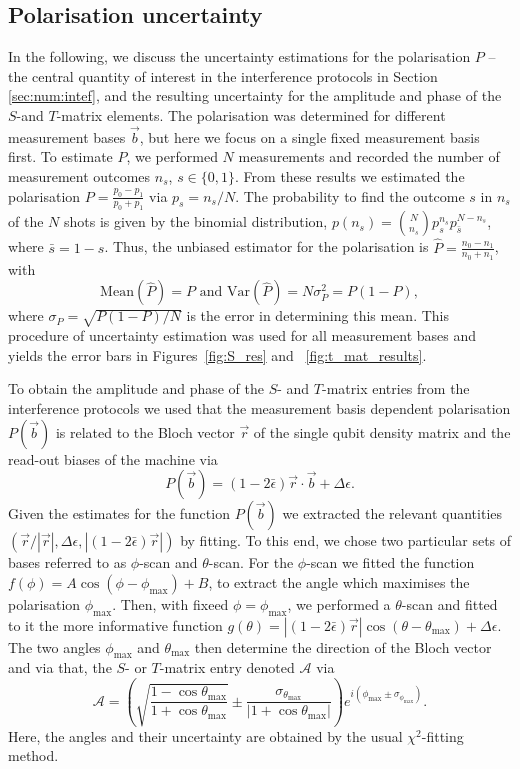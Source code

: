 \documentclass[a4paper,twocolumn,11pt, accepted=2024-06-14]{quantumarticle}
\begin{document}
\subsection{Polarisation uncertainty} \label{app:DATA_Anl}In the following, we discuss the uncertainty estimations for the polarisation $P$ -- the central quantity of interest in the interference protocols in Section \ref{sec:num:intef}, and the resulting uncertainty for the amplitude and phase of the $S$-and $T$-matrix elements. The polarisation was determined for different measurement bases $\vec b$, but here we focus on a single fixed measurement basis first. To estimate $P$, we performed $N$ measurements and recorded the number of measurement outcomes $n_s$, $s\in \{0,1\}$. From these results we estimated the polarisation $P = \frac{p_0 - p_1}{p_0 + p_1}$ via $p_s=n_s/N$. The probability to find the outcome $s$ in $n_s$ of the $N$ shots is given by the binomial distribution, $p(n_s) = {N \choose n_s} p_s^{n_s} p_{\bar{s}}^{N-n_s}$, where $\bar{s} = 1-s$. Thus,
the unbiased estimator for the polarisation is $\hat P = \frac{n_0 - n_1}{n_0 + n_1}$, with $$\text{Mean}(\hat P) =P\text{ and }\text{Var}(\hat{P}) = N\sigma_{P}^2 = P(1-P),$$ where $\sigma_{P}=\sqrt{P(1-P)/N}$ is the error in determining this mean. This procedure of uncertainty estimation was used for all measurement bases and yields the error bars in Figures~\ref{fig:S_res} and ~\ref{fig:t_mat_results}.

To obtain the amplitude and phase of the $S$- and $T$-matrix entries from the interference protocols we used that the measurement basis dependent polarisation $P(\vec b)$ is related to the Bloch vector $\vec r$ of the single qubit density matrix and the read-out biases of the machine via
$$P(\vec{b}) = (1-2\bar\epsilon)\vec{r}\cdot\vec{b} + \Delta\epsilon.$$ 
Given the estimates for the function $P(\vec{b})$ we extracted the relevant quantities $(\vec{r}/|\vec{r}|, \Delta\epsilon, |(1-2\bar\epsilon)\vec{r}|)$ by fitting. To this end, we chose two particular sets of bases referred to as $\phi$-scan and $\theta$-scan. For the $\phi$-scan we fitted the function $f(\phi) = A\cos(\phi - \phi_{\text{max}})+B$, to extract the angle which maximises the polarisation $\phi_{\text{max}}$. Then, with fixeed $\phi = \phi_{\text{max}}$, we performed a $\theta$-scan and fitted to it the more informative function $g(\theta) = |(1-2\bar\epsilon)\vec{r}|\cos(\theta - \theta_{\text{max}}) + \Delta\epsilon$. The two angles $\phi_\text{max}$ and $\theta_\text{max}$ then determine the direction of the Bloch vector and via that, the $S$- or $T$-matrix entry denoted $\mathcal A$ via  
$$\mathcal{A} = \left(\sqrt{\frac{1-\cos{\theta_\text{max}}}{1+\cos{\theta_\text{max}}}}\pm \frac{\sigma_{\theta_\text{max}}}{|1 +\cos{\theta_\text{max}|}}\right)e^{i(\phi_\text{max}\pm \sigma_{\phi_\text{max}})}.$$
Here, the angles and their uncertainty are obtained by the usual $\chi^2$-fitting method.
 
\end{document}
